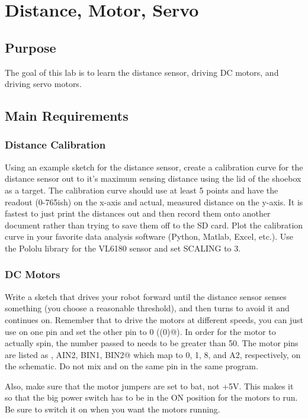 \chapter{Distance, Motor, Servo}

\section{Purpose}
The goal of this lab is to learn the distance sensor, driving DC motors, and driving 
servo motors.

\section{Main Requirements}
\subsection{Distance Calibration}
Using an example sketch for the distance sensor, create a calibration curve for the distance 
sensor out to it's maximum sensing distance using the lid of the shoebox as a target. The 
calibration curve should use at least 5 points and have the readout (0-765ish) on the x-axis
and actual, measured distance on the y-axis. It is fastest to just print the distances out and 
then record them onto another document rather than trying to save them off to the SD card.
Plot the calibration curve in your favorite data analysis software (Python, Matlab, Excel, etc.). 
Use the Pololu library for the VL6180 sensor and set SCALING to 3.

\subsection{DC Motors}
Write a sketch that drives your robot forward until the distance sensor senses something 
(you choose a reasonable threshold), and then turns to avoid it and continues on. Remember
that to drive the motors at different speeds, you can just use \lstinline@analogWrite@ on 
one pin and set the other pin to 0 (\lstinline@analogWrite(0)@). In order for the motor to 
actually spin, the number passed to \lstinline@analogWrite@ needs to be greater than 50. 
The motor pins are listed as , AIN2, BIN1, BIN2@ which map to 0, 1, 8, 
and A2, respectively, on the schematic. Do not mix \lstinline@analogWrite@ and 
\lstinline@digitalWrite@ on the same pin in the same program.

Also, make sure that the motor jumpers are set to bat, not +5V. This makes it so that 
the big power switch has to be in the ON position for the motors to run. Be sure to 
switch it on when you want the motors running. 

